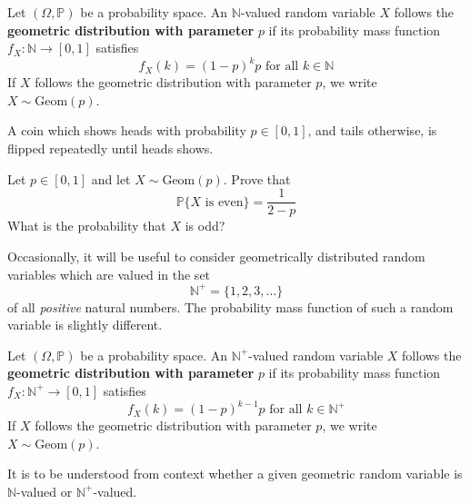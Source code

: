\begin{definition}
\label{defGeometricDistribution}
Let $(\Omega,\mathbb{P})$ be a probability space. An $\mathbb{N}$-valued random variable $X$ follows the \textbf{geometric distribution with parameter} $p$ if its probability mass function $f_X : \mathbb{N} \to [0,1]$ satisfies
\[ f_X(k) = (1-p)^kp \text{ for all } k \in \mathbb{N} \]
If $X$ follows the geometric distribution with parameter $p$, we write $X \sim \mathrm{Geom}(p)$.
\end{definition}

\begin{example}
A coin which shows heads with probability $p \in [0,1]$, and tails otherwise, is flipped repeatedly until heads shows. 
\end{example}

\begin{exercise}
Let $p \in [0,1]$ and let $X \sim \mathrm{Geom}(p)$. Prove that
\[ \mathbb{P}\{X \text{ is even}\} = \frac{1}{2-p} \]
What is the probability that $X$ is odd?
\end{exercise}

Occasionally, it will be useful to consider geometrically distributed random variables which are valued in the set
\[ \mathbb{N}^+ = \{ 1,2,3,\dots \} \]
of all \textit{positive} natural numbers. The probability mass function of such a random variable is slightly different.

\begin{definition}
\label{defGeometricDistributionPositive}
Let $(\Omega,\mathbb{P})$ be a probability space. An $\mathbb{N}^+$-valued random variable $X$ follows the \textbf{geometric distribution with parameter} $p$ if its probability mass function $f_X : \mathbb{N}^+ \to [0,1]$ satisfies
\[ f_X(k) = (1-p)^{k-1}p \text{ for all } k \in \mathbb{N}^+ \]
If $X$ follows the geometric distribution with parameter $p$, we write $X \sim \mathrm{Geom}(p)$.
\end{definition}

It is to be understood from context whether a given geometric random variable is $\mathbb{N}$-valued or $\mathbb{N}^+$-valued.

